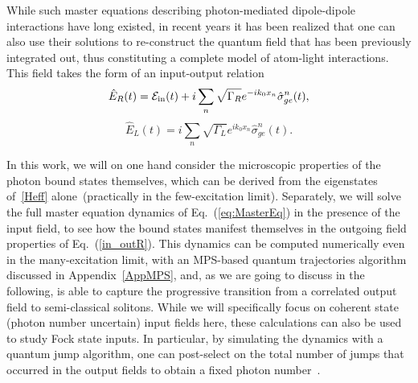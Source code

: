 \documentclass[pra,twocolumn,showpacs,preprintnumbers,amsmath,amssymb]{revtex4-1}
\begin{document}
While such master equations describing photon-mediated dipole-dipole interactions have long existed, in recent years it has been realized that one can also use their solutions to re-construct the quantum field that has been previously integrated out, thus constituting a complete model of atom-light interactions. This field takes the form of an input-output relation~\cite{Caneva, MPSJames,glauber,Blais_in} 
 \begin{equation}\label{in_outR}
 \hat E_R(t)=\mathcal{E}_{\rm in}(t)+i\sum_n\sqrt{\Gamma_R}e^{-ik_0x_n}\hat\sigma_{ge}^n(t),
\end{equation}  
 \begin{equation}\label{in_outL}
 \hat E_L(t)=i\sum_n\sqrt{\Gamma_L}e^{ik_0x_n}\hat\sigma_{ge}^n(t).
\end{equation}  

In this work, we will on one hand consider the microscopic properties of the photon bound states themselves, which can be derived from the eigenstates of~\eqref{Heff} alone~(practically in the few-excitation limit). Separately, we will solve the full master equation dynamics of Eq.~(\ref{eq:MasterEq}) in the presence of the input field, to see how the bound states manifest themselves in the outgoing field properties of Eq.~(\ref{in_outR}). This dynamics can be computed numerically even in the many-excitation limit, with an MPS-based quantum trajectories algorithm discussed in Appendix~\ref{AppMPS}, and, as we are going to discuss in the following, is able to capture the progressive transition from a correlated output field to  semi-classical solitons. 
While we will specifically focus on coherent state (photon number uncertain) input fields here, these calculations can also be used to study Fock state inputs. 
 In particular, by simulating the dynamics with a quantum jump algorithm, one can post-select on the total number of jumps that occurred in the output fields to obtain a fixed photon number~\cite{MPSJames}.
 
  

 
 
 
\end{document}
